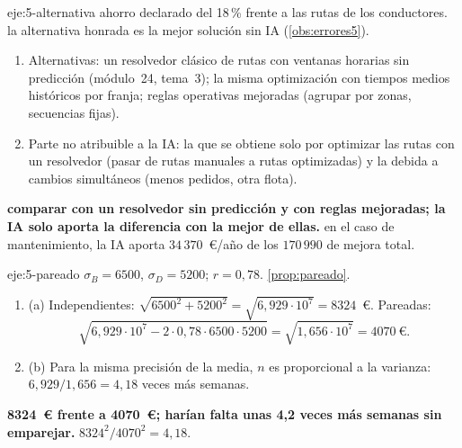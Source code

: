 \begin{solucion}{eje:5-alternativa}
\datos ahorro declarado del 18\,\% frente a las rutas de los conductores.
\planteamiento la alternativa honrada es la mejor solución sin IA (\cref{obs:errores5}).
\pasos
\begin{enumerate}[label=\arabic*.]
  \item Alternativas: un resolvedor clásico de rutas con ventanas horarias sin predicción (módulo~24, tema~3); la misma optimización con tiempos medios históricos por franja; reglas operativas mejoradas (agrupar por zonas, secuencias fijas).
  \item Parte no atribuible a la IA: la que se obtiene solo por optimizar las rutas con un resolvedor (pasar de rutas manuales a rutas optimizadas) y la debida a cambios simultáneos (menos pedidos, otra flota).
\end{enumerate}
\resultado \textbf{comparar con un resolvedor sin predicción y con reglas mejoradas; la IA solo aporta la diferencia con la mejor de ellas.}
\comprobacion en el caso de mantenimiento, la IA aporta $34\,370$~€/año de los $170\,990$ de mejora total.
\end{solucion}

\begin{solucion}{eje:5-pareado}
\datos $\sigma_B=6500$, $\sigma_D=5200$; $r=0{,}78$.
\planteamiento \cref{prop:pareado}.
\pasos
\begin{enumerate}[label=\arabic*.]
  \item (a) Independientes: $\sqrt{6500^{2}+5200^{2}}=\sqrt{6{,}929\cdot10^{7}}=8324$~€. Pareadas:
  \[
  \sqrt{6{,}929\cdot10^{7}-2\cdot0{,}78\cdot6500\cdot5200}=\sqrt{1{,}656\cdot10^{7}}=4070\ \text{€}.
  \]
  \item (b) Para la misma precisión de la media, $n$ es proporcional a la varianza: $6{,}929/1{,}656=4{,}18$ veces más semanas.
\end{enumerate}
\resultado \textbf{8324~€ frente a 4070~€; harían falta unas 4{,}2 veces más semanas sin emparejar.}
\comprobacion $8324^{2}/4070^{2}=4{,}18$.
\end{solucion}

